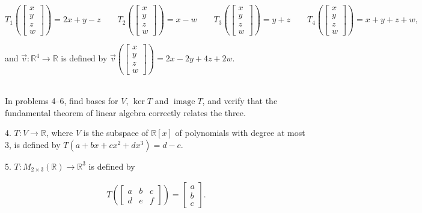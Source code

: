 \documentclass{article}
\begin{document}
$$
	T_1\left(\left[\begin{array}{c} x \\ y \\ z \\ w \end{array}\right]\right) = 2x + y - z \qquad T_2\left(\left[\begin{array}{c} x \\ y \\ z \\ w \end{array}\right]\right) = x - w \qquad T_3\left(\left[\begin{array}{c} x \\ y \\ z \\ w \end{array}\right]\right) = y + z \qquad T_4\left(\left[\begin{array}{c} x \\ y \\ z \\ w \end{array}\right]\right) = x + y + z + w,
$$

and $\vec{v} : \mathbb{R}^4 \to \mathbb{R}$ is defined by $\vec{v}\left(\left[\begin{array}{c} x \\ y \\ z \\ w \end{array}\right]\right) = 2x - 2y + 4z + 2w$.

~\\

In problems 4--6, find bases for $V$, $\ker T$ and $\operatorname{image} T$, and verify that the fundamental theorem of linear algebra correctly relates the three.

4. $T : V \to \mathbb{R}$, where $V$ is the subspace of $\mathbb{R}[x]$ of polynomials with degree at most $3$, is defined by $T(a + bx + cx^2 + dx^3) = d - c$.

5. $T : M_{2 \times 3}(\mathbb{R}) \to \mathbb{R}^3$ is defined by

\begin{align*}
	T\left( \left[\begin{array}{ccc} a& b& c \\ d& e& f \end{array}\right] \right) = \left[\begin{array}{c} a \\ b \\ c \end{array}\right].
\end{align*}
\end{document}

